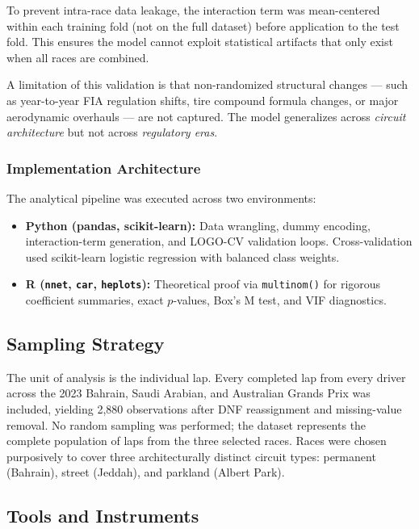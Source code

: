 To prevent intra-race data leakage, the interaction term was mean-centered
within each training fold (not on the full dataset) before application to
the test fold. This ensures the model cannot exploit statistical artifacts
that only exist when all races are combined.

A limitation of this validation is that non-randomized structural changes
--- such as year-to-year FIA regulation shifts, tire compound formula
changes, or major aerodynamic overhauls --- are not captured. The model
generalizes across \textit{circuit architecture} but not across
\textit{regulatory eras}.

\subsubsection{Implementation Architecture}

The analytical pipeline was executed across two environments:

\begin{itemize}
  \item \textbf{Python (pandas, scikit-learn):} Data wrangling, dummy
    encoding, interaction-term generation, and LOGO-CV validation loops.
    Cross-validation used scikit-learn logistic regression with balanced
    class weights.
  \item \textbf{R (\texttt{nnet}, \texttt{car}, \texttt{heplots}):}
    Theoretical proof via \texttt{multinom()} for rigorous coefficient
    summaries, exact $p$-values, Box's M test, and VIF diagnostics.
\end{itemize}

\subsection{Sampling Strategy}

The unit of analysis is the individual lap. Every completed lap from every
driver across the 2023 Bahrain, Saudi Arabian, and Australian Grands Prix
was included, yielding 2,880 observations after DNF reassignment and
missing-value removal. No random sampling was performed; the dataset
represents the complete population of laps from the three selected races.
Races were chosen purposively to cover three architecturally distinct
circuit types: permanent (Bahrain), street (Jeddah), and parkland (Albert
Park).

\subsection{Tools and Instruments}

